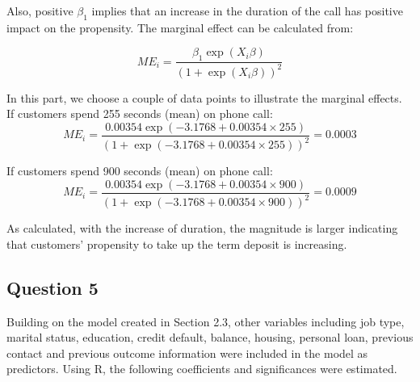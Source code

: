 \documentclass[11pt]{article}
\begin{document}
{Also, positive $\beta_1$ implies that an increase in the duration of the call has positive impact on the propensity. The marginal effect can be calculated from:

$$ME_i = \frac{\beta_1 \exp(X_i \beta)}{(1+\exp(X_i \beta))^2}$$

In this part, we choose a couple of data points to illustrate the marginal effects.\\

If customers spend 255 seconds (mean) on phone call:
$$ME_i = \frac{0.00354 \exp(-3.1768 + 0.00354 \times 255)}{(1+\exp(-3.1768 + 0.00354 \times 255))^2} = 0.0003$$

If customers spend 900 seconds (mean) on phone call:
$$ME_i = \frac{0.00354 \exp(-3.1768 + 0.00354 \times 900)}{(1+\exp(-3.1768 + 0.00354 \times 900))^2} = 0.0009$$

As calculated, with the increase of duration, the magnitude is larger indicating that customers’ propensity to take up the term deposit is increasing. 

\subsection*{Question 5}
Building on the model created in Section 2.3, other variables including job type, marital status, education, credit default, balance, housing, personal loan, previous contact and previous outcome information were included in the model as predictors. Using R, the following coefficients and significances were estimated.\\

}
\end{document}
